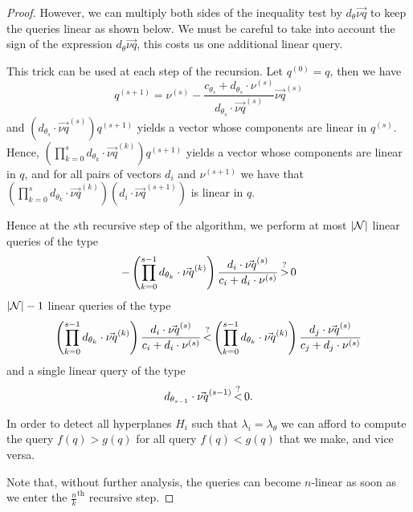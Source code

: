 \begin{proof}
However, we can multiply both sides of the inequality test by \(d_\theta
\vec{\nu q}\) to keep the queries linear as shown below. We must be careful to
take into account the sign of the expression \(d_\theta \vec{\nu q}\), this
costs us one additional linear query.

This trick can be used at each step of the recursion. Let \(q^{(0)} = q\),
then we have
$$
	q^{(s+1)} = \nu^{(s)} - \frac{c_{\theta_{s}} + d_{\theta_{s}} \cdot
	\nu^{(s)}}{d_{\theta_{s}} \cdot \vec{\nu q}^{(s)}}\vec{\nu q}^{(s)}
$$
and \( (d_{\theta_{s}}\cdot \vec{\nu q}^{(s)}) q^{(s+1)}\) yields a vector
whose components are linear in \(q^{(s)}\).
Hence,
\( (\prod_{k=0}^{s} d_{\theta_{k}} \cdot \vec{\nu q}^{(k)})
 q^{(s+1)}\) yields a vector
whose components are linear in \(q\),
and for all pairs of vectors \(d_i\) and \(\nu^{(s+1)}\)
we have that \( (\prod_{k=0}^{s} d_{\theta_{k}} \cdot \vec{\nu q}^{(k)}) (d_i
\cdot \vec{\nu q}^{(s+1)})\) is linear in \(q\).

Hence at the $s$th recursive step of the algorithm, we perform
at most \(|{\mathcal{N}}|\) linear queries of the type
$$
	-\left(\prod_{k=0}^{s-1} d_{\theta_{k}} \cdot \vec{\nu q}^{(k)}\right)
\frac{d_i \cdot \vec{\nu q}^{(s)}}{c_i + d_i \cdot
	\nu^{(s)}} \mathop{>}^{?} 0
$$
\(|{\mathcal{N}}| - 1\) linear queries of the type
$$
	\left(\prod_{k=0}^{s-1} d_{\theta_{k}} \cdot \vec{\nu q}^{(k)}\right)
	\frac{d_i \cdot \vec{\nu q}^{(s)}}{c_i + d_i \cdot \nu^{(s)}}
\mathop{<}^{?}
\left(\prod_{k=0}^{s-1} d_{\theta_{k}} \cdot \vec{\nu q}^{(k)}\right)
\frac{d_j \cdot \vec{\nu q}^{(s)}}{c_j + d_j \cdot \nu^{(s)}}
$$
and a single linear query of the type
$$
	d_{\theta_{s-1}} \cdot \vec{\nu q}^{(s-1)} \mathop{<}^{?} 0.
$$

In order to detect all hyperplanes \(H_i\) such that \(\lambda_i =
\lambda_\theta\) we can afford to compute the query $f(q) > g(q)$ for all query
$f(q) < g(q)$ that we make, and vice versa.

Note that, without further analysis, the queries can become \(n\)-linear as
soon as we enter the \(\frac{n}{k}^{\text{th}}\) recursive step.
\end{proof}


